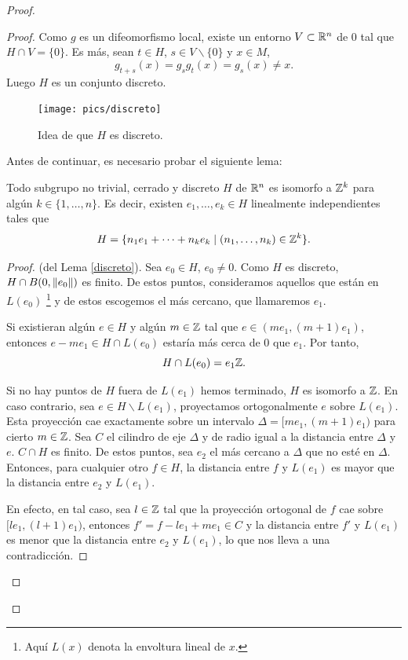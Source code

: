 \begin{proof}
\begin{proof}
 Como $g$ es un difeomorfismo local, existe un entorno $V\subset \mathbb{R}^n$ de 0 tal que $H\cap V= \{0\}$. Es más, sean $t\in H$, $s\in V\backslash \{0\}$ y $x\in M$, 
  \[
    g_{t+s}(x)=g_sg_t(x)=g_s(x)\neq x.
  \]
  Luego $H$ es un conjunto discreto. 
  \begin{figure}[h]
    \centering
    \texttt{[image: pics/discreto]}
    \caption{\small Idea de que $H$ es discreto.}
    \label{fig:discreto}
  \end{figure}

  Antes de continuar, es necesario probar el siguiente lema:

  \begin{lema}\label{discreto}
    Todo subgrupo no trivial, cerrado y discreto $H$ de $\mathbb{R}^n$ es isomorfo a $\mathbb{Z}^k$ para algún $k\in\{1,\dots,n\}$. Es decir, existen $e_1,\dots,e_k \in H$ linealmente independientes tales que 
    \[
      H=\{n_1e_1+\cdots+n_ke_k \mid (n_1,\dots,n_k) \in \mathbb{Z}^k \}.
    \]
  \end{lema}
  \begin{proof}(del Lema \ref{discreto}). 
  Sea $e_0 \in H$, $e_0 \neq 0$. Como $H$ es discreto, $H \cap B(0,\left\Vert e_0\right\Vert)$ es finito. De estos puntos, consideramos aquellos que están en $L(e_0)$ \footnote{Aquí $L(x)$ denota la envoltura lineal de $x$.} y de estos escogemos el más cercano, que llamaremos $e_1$. 
  
  Si existieran algún $e \in H$ y algún $m \in \mathbb{Z}$ tal que $e \in (me_1,(m+1)e_1)$, entonces $e-me_1 \in H \cap L(e_0)$ estaría más cerca de 0 que $e_1$. Por tanto, 
  \[
    H\cap L(e_0) = e_1\mathbb{Z}.
  \]

  Si no hay puntos de $H$ fuera de $L(e_1)$ hemos terminado, $H$ es isomorfo a $\mathbb{Z}$. En caso contrario, sea $e \in H \backslash L(e_1)$, proyectamos ortogonalmente $e$ sobre $L(e_1)$. Esta proyección cae exactamente sobre un intervalo $\Delta=[me_1,(m+1)e_1)$ para cierto $m \in \mathbb{Z}$. Sea $C$ el cilindro de eje $\Delta$ y de radio igual a la distancia entre $\Delta$ y $e$. $C\cap H$ es finito. De estos puntos, sea $e_2$ el más cercano a $\Delta$ que no esté en $\Delta$. Entonces, para cualquier otro $f \in H$, la distancia entre $f$ y $L(e_1)$ es mayor que la distancia entre $e_2$ y $L(e_1)$. 
    
    En efecto, en tal caso, sea $l \in \mathbb{Z}$ tal que la proyección ortogonal de $f$ cae sobre $[le_1,(l+1)e_1)$, entonces $f'=f-le_1+me_1 \in C$ y la distancia entre $f'$ y $L(e_1)$ es menor que la distancia entre $e_2$ y $L(e_1)$, lo que nos lleva a una contradicción.


\end{proof}
\end{proof}
\end{proof}
